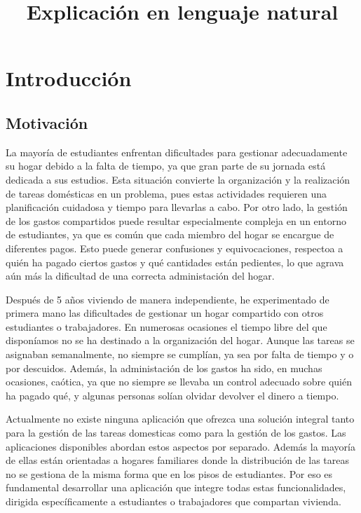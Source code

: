 \documentclass{article}
\title{Explicación en lenguaje natural}
\author{}
\date{}
\begin{document}
\maketitle

\section{Introducción}

\subsection{Motivación}

La mayoría de estudiantes enfrentan dificultades para gestionar adecuadamente su hogar debido a la falta de tiempo, ya que gran parte de su jornada
está dedicada a sus estudios. Esta situación convierte la organización y la realización de tareas domésticas en un problema, pues estas actividades requieren 
una planificación cuidadosa y tiempo para llevarlas a cabo. Por otro lado, la gestión de los gastos compartidos puede resultar especialmente compleja en un entorno 
de estudiantes, ya que es común que cada miembro del hogar se encargue de diferentes pagos. Esto puede generar confusiones y equivocaciones, 
respectoa a quién ha pagado ciertos gastos y qué cantidades están pedientes, lo que agrava aún más la dificultad de una correcta
administación del hogar.

Después de 5 años viviendo de manera independiente, he experimentado de primera mano las dificultades de gestionar un hogar compartido con otros estudiantes o trabajadores. En numerosas ocasiones 
el tiempo libre del que disponíamos no se ha destinado a la organización del hogar. Aunque las tareas se asignaban semanalmente, no siempre se cumplían, ya sea
por falta de tiempo y o por descuidos. Además, la administación de los gastos ha sido, en muchas ocasiones, caótica, ya que no siempre se llevaba un control adecuado sobre quién ha pagado qué,
y algunas personas solían olvidar devolver el dinero a tiempo.  

Actualmente no existe ninguna aplicación que ofrezca una solución integral tanto para la gestión de las tareas domesticas como para la gestión de los gastos. Las aplicaciones
disponibles abordan estos aspectos por separado. Además la mayoría de ellas están orientadas a hogares familiares donde la distribución de las tareas no se gestiona de la misma forma que 
en los pisos de estudiantes. Por eso es fundamental desarrollar una aplicación que integre todas estas funcionalidades, dirigida específicamente a estudiantes o trabajadores que compartan vivienda. 
\end{document}

